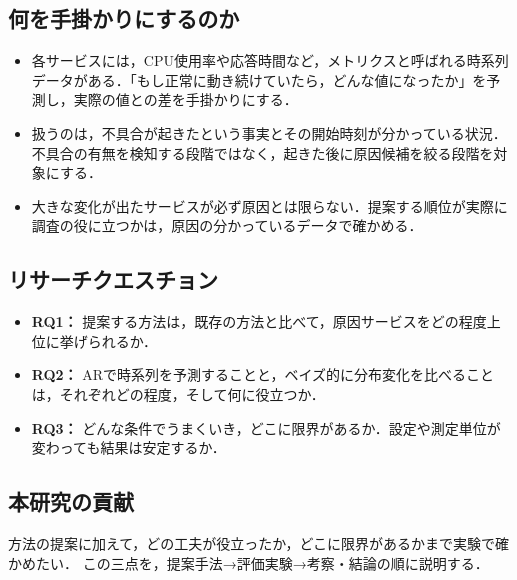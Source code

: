 \subsection{何を手掛かりにするのか}
\begin{itemize}
    \item 各サービスには，CPU使用率や応答時間など，メトリクスと呼ばれる時系列データがある．「もし正常に動き続けていたら，どんな値になったか」を予測し，実際の値との差を手掛かりにする．
    \item 扱うのは，不具合が起きたという事実とその開始時刻が分かっている状況．不具合の有無を検知する段階ではなく，起きた後に原因候補を絞る段階を対象にする．
    \item 大きな変化が出たサービスが必ず原因とは限らない．提案する順位が実際に調査の役に立つかは，原因の分かっているデータで確かめる．
\end{itemize}

\subsection{リサーチクエスチョン}
\label{sec:rq}
\begin{itemize}
    \item \textbf{RQ1：} 提案する方法は，既存の方法と比べて，原因サービスをどの程度上位に挙げられるか．
    \item \textbf{RQ2：} ARで時系列を予測することと，ベイズ的に分布変化を比べることは，それぞれどの程度，そして何に役立つか．
    \item \textbf{RQ3：} どんな条件でうまくいき，どこに限界があるか．設定や測定単位が変わっても結果は安定するか．
\end{itemize}

\subsection{本研究の貢献}
\label{sec:claims}
方法の提案に加えて，どの工夫が役立ったか，どこに限界があるかまで実験で確かめたい．
この三点を，提案手法→評価実験→考察・結論の順に説明する．
